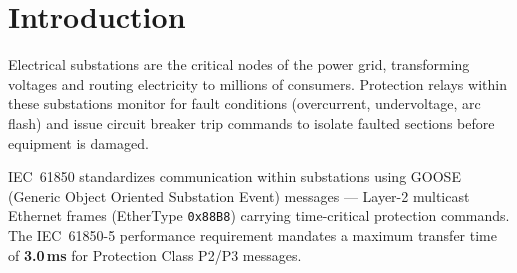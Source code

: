 \documentclass[11pt,a4paper]{article}
\begin{document}
\begin{abstract}
\noindent
We present \textbf{Crypto-Induced Latency Denial of Service (CIL-DoS)}, a novel protocol-level vulnerability in IEC~62351-6, the cryptographic authentication standard for IEC~61850 GOOSE (Generic Object Oriented Substation Event) messages in electrical substations. IEC~62351-6 mandates that receiving Intelligent Electronic Devices (IEDs) perform full cryptographic verification on every incoming GOOSE frame before acceptance. We demonstrate that an attacker with Layer-2 access to the substation process bus can flood structurally valid but cryptographically invalid GOOSE frames, saturating the IED's verification queue and delaying safety-critical protection trip commands past the 3.0\,ms IEC~61850 deadline.

Our evidence spans two hardware platforms (ESP32 Xtensa~LX6 and Raspberry~Pi~5 ARM Cortex-A76), 50{,}000-iteration benchmarks, 50{,}000-frame PCAP captures with real GOOSE frames (EtherType \texttt{0x88B8}), a Docker-based reproducible testbed with 49 controlled experiments, and formal queueing-theoretic proofs. We also present \textbf{PQAC (Priority Queue Admission Controller)}, a three-stage O(1) defense achieving 3{,}140$\times$ latency reduction with 0.00\% deadline miss rate.

\medskip
\noindent\textbf{Keywords:} IEC~62351-6, IEC~61850, GOOSE, denial of service, cryptographic verification, substation protection, smart grid security, CWE-400
\end{abstract}

\tableofcontents
\newpage

\section{Introduction}

Electrical substations are the critical nodes of the power grid, transforming voltages and routing electricity to millions of consumers. Protection relays within these substations monitor for fault conditions (overcurrent, undervoltage, arc flash) and issue circuit breaker trip commands to isolate faulted sections before equipment is damaged.

IEC~61850 standardizes communication within substations using GOOSE (Generic Object Oriented Substation Event) messages --- Layer-2 multicast Ethernet frames (EtherType \texttt{0x88B8}) carrying time-critical protection commands. The IEC~61850-5 performance requirement mandates a maximum transfer time of \textbf{3.0\,ms} for Protection Class P2/P3 messages.
\end{document}

